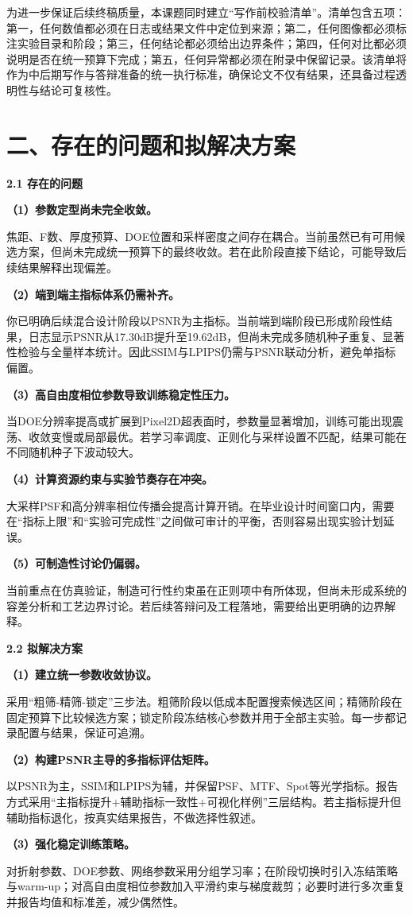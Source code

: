 \documentclass[UTF8,12pt,fontset=fandol]{ctexart}
\newcommand{\hfirst}[1]{%
\vspace{0.6em}
\noindent\textbf{#1}\par
}
\newcommand{\subh}[1]{%
\vspace{0.4em}
\noindent\textbf{#1}\par
}
\begin{document}
为进一步保证后续终稿质量，本课题同时建立“写作前校验清单”。清单包含五项：第一，任何数值都必须在日志或结果文件中定位到来源；第二，任何图像都必须标注实验目录和阶段；第三，任何结论都必须给出边界条件；第四，任何对比都必须说明是否在统一预算下完成；第五，任何异常都必须在附录中保留记录。该清单将作为中后期写作与答辩准备的统一执行标准，确保论文不仅有结果，还具备过程透明性与结论可复核性。


\section*{二、存在的问题和拟解决方案}

\hfirst{2.1 存在的问题}
\subh{（1）参数定型尚未完全收敛。}
焦距、F数、厚度预算、DOE位置和采样密度之间存在耦合。当前虽然已有可用候选方案，但尚未完成统一预算下的最终收敛。若在此阶段直接下结论，可能导致后续结果解释出现偏差。

\subh{（2）端到端主指标体系仍需补齐。}
你已明确后续混合设计阶段以PSNR为主指标。当前端到端阶段已形成阶段性结果，日志显示PSNR从17.30dB提升至19.62dB，但尚未完成多随机种子重复、显著性检验与全量样本统计。因此SSIM与LPIPS仍需与PSNR联动分析，避免单指标偏置。

\subh{（3）高自由度相位参数导致训练稳定性压力。}
当DOE分辨率提高或扩展到Pixel2D超表面时，参数量显著增加，训练可能出现震荡、收敛变慢或局部最优。若学习率调度、正则化与采样设置不匹配，结果可能在不同随机种子下波动较大。

\subh{（4）计算资源约束与实验节奏存在冲突。}
大采样PSF和高分辨率相位传播会提高计算开销。在毕业设计时间窗口内，需要在“指标上限”和“实验可完成性”之间做可审计的平衡，否则容易出现实验计划延误。

\subh{（5）可制造性讨论仍偏弱。}
当前重点在仿真验证，制造可行性约束虽在正则项中有所体现，但尚未形成系统的容差分析和工艺边界讨论。若后续答辩问及工程落地，需要给出更明确的边界解释。

\hfirst{2.2 拟解决方案}
\subh{（1）建立统一参数收敛协议。}
采用“粗筛-精筛-锁定”三步法。粗筛阶段以低成本配置搜索候选区间；精筛阶段在固定预算下比较候选方案；锁定阶段冻结核心参数并用于全部主实验。每一步都记录配置与结果，保证可追溯。

\subh{（2）构建PSNR主导的多指标评估矩阵。}
以PSNR为主，SSIM和LPIPS为辅，并保留PSF、MTF、Spot等光学指标。报告方式采用“主指标提升+辅助指标一致性+可视化样例”三层结构。若主指标提升但辅助指标退化，按真实结果报告，不做选择性叙述。

\subh{（3）强化稳定训练策略。}
对折射参数、DOE参数、网络参数采用分组学习率；在阶段切换时引入冻结策略与warm-up；对高自由度相位参数加入平滑约束与梯度裁剪；必要时进行多次重复并报告均值和标准差，减少偶然性。
\end{document}
